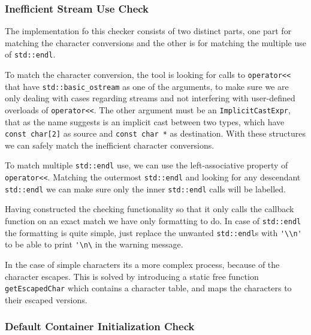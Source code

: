 \subsubsection{Inefficient Stream Use Check}
\par The implementation fo this checker consists of two distinct parts, one part for matching the character conversions and the other is for matching the multiple use of \verb|std::endl|. \medskip
\par To match the character conversion, the tool is looking for calls to \verb|operator<<| that have \verb|std::basic_ostream| as one of the arguments, to make sure we are only dealing with cases regarding streams and not interfering with user-defined overloads of \verb|operator<<|. The other argument must be an \verb|ImplicitCastExpr|, that as the name suggests is an implicit cast between two types, which have \verb|const char[2]| as source and \verb|const char *| as destination. With these structures we can safely match the inefficient character conversions. \medskip
\par To match multiple \verb|std::endl| use, we can use the left-associative property of \verb|operator<<|. Matching the outermost \verb|std::endl| and looking for any descendant \verb|std::endl| we can make sure only the inner \verb|std::endl| calls will be labelled. \medskip
\par Having constructed the checking functionality so that it only calls the callback function on an exact match we have only formatting to do. In case of \verb|std::endl| the formatting is quite simple, just replace the unwanted \verb|std::endl|s with \verb|'\\n'| to be able to print \verb|'\n\| in the warning message. \medskip
\par In the case of simple characters its a more complex process, because of the character escapes. This is solved by introducing a static free function \verb|getEscapedChar| which contains a character table, and maps the characters to their escaped versions. 
\subsubsection{Default Container Initialization Check}
